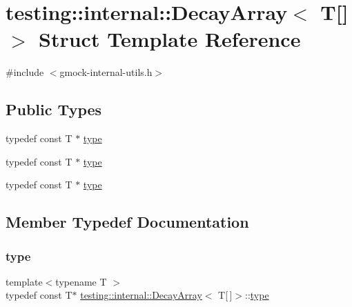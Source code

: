 \hypertarget{structtesting_1_1internal_1_1_decay_array_3_01_t[]_4}{}\section{testing\+::internal\+::Decay\+Array$<$ T\mbox{[}\mbox{]}$>$ Struct Template Reference}
\label{structtesting_1_1internal_1_1_decay_array_3_01_t[]_4}


{\ttfamily \#include $<$gmock-\/internal-\/utils.\+h$>$}

\subsection*{Public Types}
\begin{DoxyCompactItemize}
\item 
typedef const T $\ast$ \mbox{\hyperlink{structtesting_1_1internal_1_1_decay_array_3_01_t[]_4_a1820b673d104b3a985faaef8db5d77d2}{type}}
\item 
typedef const T $\ast$ \mbox{\hyperlink{structtesting_1_1internal_1_1_decay_array_3_01_t[]_4_a1820b673d104b3a985faaef8db5d77d2}{type}}
\item 
typedef const T $\ast$ \mbox{\hyperlink{structtesting_1_1internal_1_1_decay_array_3_01_t[]_4_a1820b673d104b3a985faaef8db5d77d2}{type}}
\end{DoxyCompactItemize}


\subsection{Member Typedef Documentation}
\mbox{\label{structtesting_1_1internal_1_1_decay_array_3_01_t[]_4_a1820b673d104b3a985faaef8db5d77d2}} 
\subsubsection{\texorpdfstring{type}{type}\hspace{0.1cm}{\footnotesize\ttfamily [1/3]}}
{\footnotesize\ttfamily template$<$typename T $>$ \\
typedef const T$\ast$ \mbox{\hyperlink{structtesting_1_1internal_1_1_decay_array}{testing\+::internal\+::\+Decay\+Array}}$<$ T\mbox{[}$\,$\mbox{]}$>$\+::\mbox{\hyperlink{structtesting_1_1internal_1_1_decay_array_3_01_t[]_4_a1820b673d104b3a985faaef8db5d77d2}{type}}}

